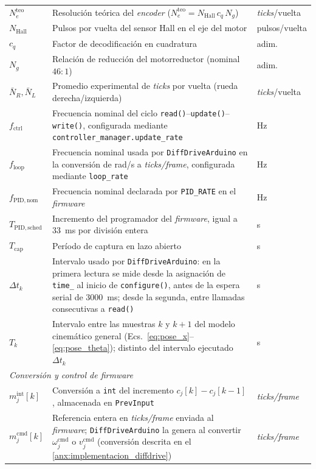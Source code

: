 \begin{appendices}
{\begin{longtable}{p{2.7cm} p{8.5cm} p{2.2cm}}
$N_e^{\mathrm{teo}}$ & Resolución teórica del \textit{encoder} ($N_e^{\mathrm{teo}}=N_{\mathrm{Hall}}\,c_q\,N_g$) & \textit{ticks}/vuelta \\
$N_{\mathrm{Hall}}$ & Pulsos por vuelta del sensor Hall en el eje del motor & pulsos/vuelta \\
$c_q$ & Factor de decodificación en cuadratura & adim. \\
$N_g$ & Relación de reducción del motorreductor (nominal $46{:}1$) & adim. \\
$\bar{N}_R,\bar{N}_L$ & Promedio experimental de \textit{ticks} por vuelta (rueda derecha/izquierda) & \textit{ticks}/vuelta \\
$f_{\mathrm{ctrl}}$ & Frecuencia nominal del ciclo \texttt{read()}--\texttt{update()}--\texttt{write()}, configurada mediante \texttt{controller\_manager.update\_rate} & Hz \\
$f_{\mathrm{loop}}$ & Frecuencia nominal usada por \texttt{DiffDriveArduino} en la conversión de rad/s a \textit{ticks/frame}, configurada mediante \texttt{loop\_rate} & Hz \\
$f_{\mathrm{PID,nom}}$ & Frecuencia nominal declarada por \texttt{PID\_RATE} en el \textit{firmware} & Hz \\
$T_{\mathrm{PID,sched}}$ & Incremento del programador del \textit{firmware}, igual a 33~ms por división entera & s \\
$T_{\mathrm{cap}}$ & Período de captura en lazo abierto & s \\
$\Delta t_k$ & Intervalo usado por \texttt{DiffDriveArduino}: en la primera lectura se mide desde la asignación de \texttt{time\_} al inicio de \texttt{configure()}, antes de la espera serial de 3000~ms; desde la segunda, entre llamadas consecutivas a \texttt{read()} & s \\
$T_k$ & Intervalo entre las muestras $k$ y $k+1$ del modelo cinemático general (Ecs.~\eqref{eq:pose_x}--\eqref{eq:pose_theta}); distinto del intervalo ejecutado $\Delta t_k$ & s \\
\multicolumn{3}{l}{\textit{Conversión y control de firmware}}\\
$m_j^{\mathrm{int}}[k]$ & Conversión a \texttt{int} del incremento $c_j[k]-c_j[k-1]$, almacenada en \texttt{PrevInput} & \textit{ticks/frame} \\
$m_j^{\mathrm{cmd}}[k]$ & Referencia entera en \textit{ticks/frame} enviada al \textit{firmware}; \texttt{DiffDriveArduino} la genera al convertir $\omega_j^{\mathrm{cmd}}$ o $v_j^{\mathrm{cmd}}$ (conversión descrita en el \ref{anx:implementacion_diffdrive}) & \textit{ticks/frame} \\

\end{longtable}}
\end{appendices}
